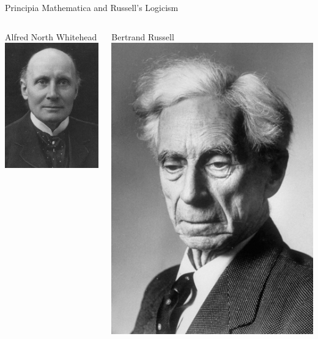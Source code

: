 \documentclass{beamer}
\begin{document}
\begin{frame}{Principia Mathematica and Russell's Logicism}
  \begin{columns}[c]

    \begin{block}{Alfred North Whitehead}
      \includegraphics[height=0.35\textheight]{images/whitehead.jpg}
    \end{block}

    \begin{block}{Bertrand Russell}
      \includegraphics[height=0.35\textheight]{images/russell.jpg}
    \end{block}


\end{columns}
\end{frame}
\end{document}
